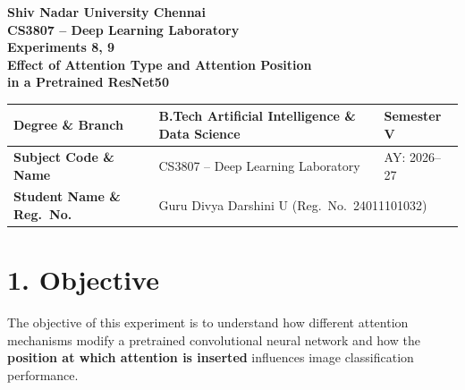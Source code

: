 \documentclass[10pt]{article}
\begin{document}

\begin{center}

{\large\textbf{Shiv Nadar University Chennai}}\\[2mm]

{\normalsize\textbf{CS3807 -- Deep Learning Laboratory}}\\[2mm]

{\large\textbf{Experiments 8, 9}}\\[1mm]

{\normalsize
\textbf{
Effect of Attention Type and Attention Position\\
in a Pretrained ResNet50
}}

\end{center}

\vspace{3mm}


\begin{center}
\begin{tabular}{|p{3.5cm}|p{8.7cm}|p{2.1cm}|}
\hline
\textbf{Degree \& Branch}
&
B.Tech Artificial Intelligence \& Data Science
&
Semester V
\\
\hline

\textbf{Subject Code \& Name}
&
CS3807 -- Deep Learning Laboratory
&
AY: 2026--27
\\
\hline

\textbf{Student Name \& Reg.\ No.}
&
\multicolumn{2}{p{10.9cm}|}{Guru Divya Darshini U \quad (Reg.\ No.\ 24011101032)}
\\
\hline
\end{tabular}
\end{center}

\section*{1. Objective}

The objective of this experiment is to understand how different attention
mechanisms modify a pretrained convolutional neural network and how the
\textbf{position at which attention is inserted} influences image
classification performance.
\end{document}
